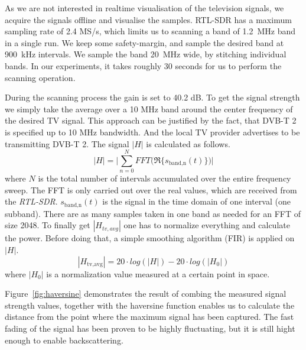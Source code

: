 As we are not interested in realtime visualisation of the television
signals, we acquire the signals offline and visualise the samples.
RTL-SDR has a maximum sampling rate of 2.4 MS/s, which limits us to
scanning a band of \SI{1.2}{\mega\hertz} band in a single run. We  keep some safety-margin, and
sample the desired band at \SI{900}{\kilo\hertz} intervals. We sample the band 
\SI{20}{\mega\hertz} wide, by stitching individual bands. In our experiments, it takes roughly 30
seconds for us to perform the scanning operation.


 
During the scanning process the gain is set to 40.2 dB. To get the
signal strength we simply take the average over a 10 MHz band around the
center frequency of the desired TV signal. This approach can be
justified by the fact, that DVB-T 2 is specified up to 10 MHz bandwidth.
And the local TV provider advertises to be transmitting DVB-T 2.
The signal \ensuremath{|H|} is calculated as follows.  
\begin{equation}
	|H| = \Biggl| \sum_{n=0}^N FFT\biggl( \Re\{ s_{\text{band,n}}(t) \} \biggr) \Biggr|
\end{equation}     where \ensuremath{N} is the total number of intervals
accumulated over the entire frequency sweep. The FFT is only carried out over
the real values, which are received from the \textit{RTL-SDR}.
\ensuremath{s_{\text{band,n}}(t)} is the signal in the time domain of one
interval (one subband). There are as many samples taken in one band as needed
for an FFT of size 2048. To finally get \ensuremath{|H_{tv,avg}|} one has to
normalize everything and calculate the power. Before doing that, a simple
smoothing algorithm (FIR) is applied on \ensuremath{|H|}.  
\begin{equation}
	|H_{\text{tv,avg}}| = 20 \cdot log (|H|) - 20 \cdot log(|H_0|)
\end{equation}   
where \ensuremath{|H_0|} is a normalization value measured at a certain point
in space. 

Figure~\ref{fig:haversine} demonstrates the result of combing the measured
signal strength values, together with the haversine function enables us to
calculate the distance from the point where the maximum signal has been
captured. The fast fading of the signal has been proven to be highly fluctuating, but it is still hight enough to enable backscattering.    

